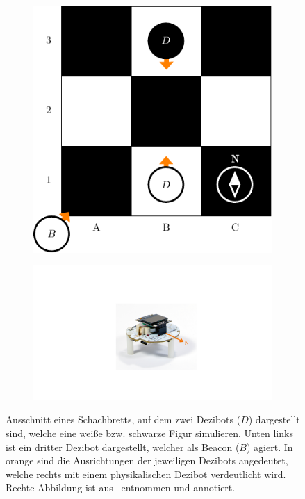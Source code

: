 \begin{figure}[h]
    \centering
    \begin{subfigure}[c]{0.5\textwidth}
        \includegraphics[width=\textwidth]{../assets/usage.drawio.pdf}
    \end{subfigure}
    \hspace{1em}
    \begin{subfigure}[c]{0.45\textwidth}
        \includegraphics[width=\textwidth]{../assets/dezibot_total_view_north.pdf}
    \end{subfigure}
    \caption{Ausschnitt eines Schachbretts, auf dem zwei Dezibots ($D$) dargestellt sind, welche eine weiße bzw. schwarze Figur simulieren. Unten links ist ein dritter Dezibot dargestellt, welcher als Beacon ($B$) agiert. In orange sind die Ausrichtungen der jeweiligen Dezibots angedeutet, welche rechts mit einem physikalischen Dezibot verdeutlicht wird. Rechte Abbildung ist aus~\cite{dezibotteamDezibotDezibot2025} entnommen und annotiert.}
    \label{fig:usage}
\end{figure}

